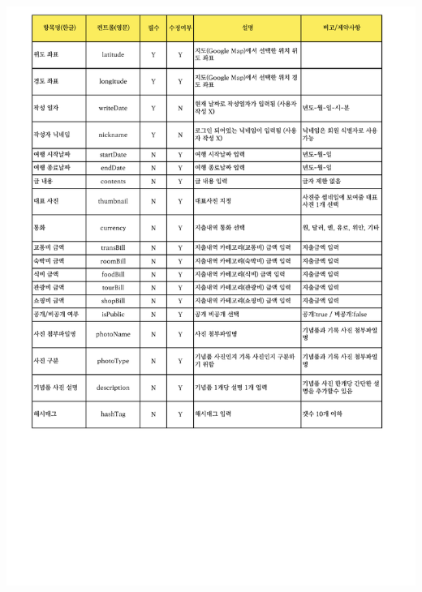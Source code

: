 {{{{{{{{{{{{{{{{{{{{{{\includegraphics[width=20cm]{./Figure/Design/Display/diary/diary_04.pdf} \\
}}}}}}}}}}}}}}}}}}}}}}
